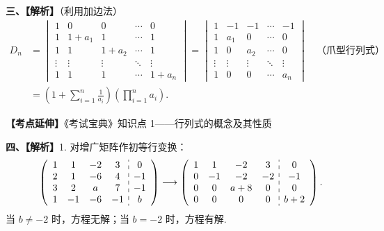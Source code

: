 \documentclass[a4paper,11pt]{ctexart}
\begin{document}
\vspace{0.8em}

\textbf{三、【解析】}（利用加边法）
\begin{align*}
  D_n &= \begin{vmatrix}
    1 & 0 & 0 & \cdots & 0 \\
    1 & 1 + a_1 & 1 & \cdots & 1 \\
    1 & 1 & 1 + a_2 & \cdots & 1 \\
    \vdots & \vdots & \vdots & \ddots & \vdots \\
    1 & 1 & 1 & \cdots & 1 + a_n
  \end{vmatrix}
  = \begin{vmatrix}
    1 & -1 & -1 & \cdots & -1 \\
    1 & a_1 & 0 & \cdots & 0 \\
    1 & 0 & a_2 & \cdots & 0 \\
    \vdots & \vdots & \vdots & \ddots & \vdots \\
    1 & 0 & 0 & \cdots & a_n
  \end{vmatrix} \quad\text{（爪型行列式）} \\
  &= \left(1 + \sum_{i=1}^n \frac{1}{a_i}\right)\left(\prod_{i=1}^n a_i\right).
\end{align*}

\textbf{【考点延伸】}《考试宝典》知识点 1——行列式的概念及其性质

\vspace{0.8em}

\textbf{四、【解析】}1. 对增广矩阵作初等行变换：
\[
  \left(\begin{array}{cccc:c}
    1 & 1 & -2 & 3 & 0 \\
    2 & 1 & -6 & 4 & -1 \\
    3 & 2 & a & 7 & -1 \\
    1 & -1 & -6 & -1 & b
  \end{array}\right)
  \longrightarrow \left(\begin{array}{cccc:c}
    1 & 1 & -2 & 3 & 0 \\
    0 & -1 & -2 & -2 & -1 \\
    0 & 0 & a + 8 & 0 & 0 \\
    0 & 0 & 0 & 0 & b + 2
  \end{array}\right).
\]
当 $b \neq -2$ 时，方程无解；当 $b = -2$ 时，方程有解.
\end{document}
